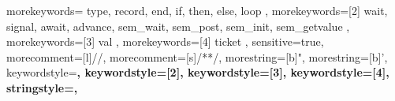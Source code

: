 %
{%
	morekeywords={%
		type,
		record,
		end,
		if,
		then,
		else,
		loop
	},%
	morekeywords=[2]{%
		wait,
		signal,
		await,
		advance,
		sem_wait,
		sem_post,
		sem_init,
		sem_getvalue
	},%
	morekeywords=[3]{%
		val
	},%
	morekeywords=[4]{%
		ticket
	},%
	sensitive=true,%
	morecomment=[l]{//},%
	morecomment=[s]{/*}{*/},%
	morestring=[b]",%
	morestring=[b]',%
	keywordstyle=\bfseries\ttfamily\color{blue},%
	keywordstyle=[2]\bfseries\ttfamily\color{teal},%
	keywordstyle=[3]\bfseries\ttfamily\color{olive},%
	keywordstyle=[4]\bfseries\ttfamily\color{olive},%
	stringstyle=\color{green}\ttfamily,%
}%
%
%
%
%
%
%
%
%
%
%
